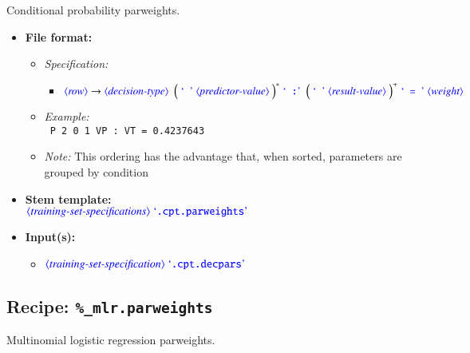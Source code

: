 \documentclass[12pt]{report}
\def\blue{\color{blue}}
\def\magenta{\color{magenta}}
\begin{document}
Conditional probability parweights.

\begin{itemize}
      \item \textbf{File format:}
      \begin{itemize}
            \item \textit{Specification:}
            \begin{itemize}
                  \item {\small $\dtype{row} \rightarrow \dtype{decision-type} \ \ \smash{\Big( \ \dcode{\ } \ \dtype{predictor-value} \ \Big)^*} \ \dcode{ :} \ \ \smash{\Big( \ \dcode{\ } \ \dtype{result-value} \ \Big)^+} \ \dcode{ = } \ \dtype{weight}$}
            \end{itemize}
            \item \textit{Example:}\\
            {\magenta\tt
            P 2 0 1 VP : VT = 0.4237643
            }
            \item \textit{Note:} This ordering has the advantage that, when sorted, parameters are grouped by condition
      \end{itemize}
      \item \textbf{Stem template:}\\
      $\dtype{training-set-specifications}  \ \dcode{.cpt.parweights}$
      \item \textbf{Input(s):}
      \begin{itemize}
            \item $\dtype{training-set-specification} \ \dcode{.cpt.decpars}$
      \end{itemize}
\end{itemize}

\subsection{Recipe: \blue\tt \%\_mlr.parweights}

Multinomial logistic regression parweights.
\end{document}

